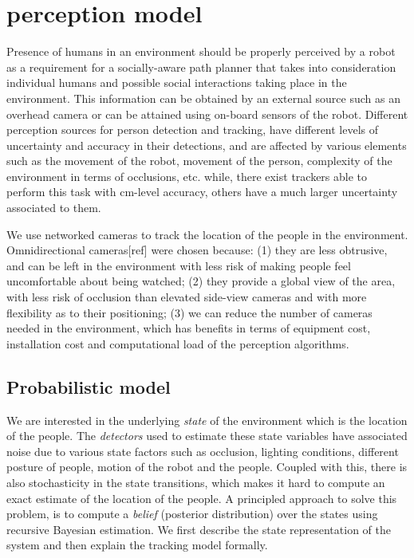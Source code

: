 \section{perception model}
\label{sec: perception model}


Presence of humans in an environment should be properly perceived by a robot as a requirement for a socially-aware path planner that takes into consideration individual humans and possible social interactions taking place in the environment. This information can be obtained by an external source such as an overhead camera or can be attained using on-board sensors of the robot. Different perception sources for person detection and tracking, have different levels of uncertainty and accuracy in their detections, and are affected by various elements such as the movement of the robot, movement of the person, complexity of the environment in terms of occlusions, etc. while, there exist trackers able to perform this task with cm-level accuracy, others have a much larger uncertainty associated to them. 

We use networked cameras to track the location of the people in the environment. Omnidirectional cameras[ref] were chosen because: (1) they are less obtrusive, and can be left in the environment with less risk
of making people feel uncomfortable about being watched; (2) they provide a global view of the area, with less risk of occlusion than elevated side-view cameras and with more flexibility as to their positioning; (3) we can reduce the number of cameras needed in the environment, which has benefits
in terms of equipment cost, installation cost and computational load of the perception algorithms.

\subsection{Probabilistic model}

We are interested in the underlying \textit{state} of the environment which is the location of the people. The \textit{detectors} used to estimate these state variables have associated noise due to various state factors such as occlusion, lighting conditions, different posture of people, motion of the robot and the people. Coupled with this, there is also stochasticity in the state transitions, which makes it hard to compute an exact estimate of the location of the people. A principled approach to solve this problem, is to compute a \textit{belief} (posterior distribution) over the states using recursive Bayesian estimation. We first describe the state representation of the system and then explain the tracking model formally.


